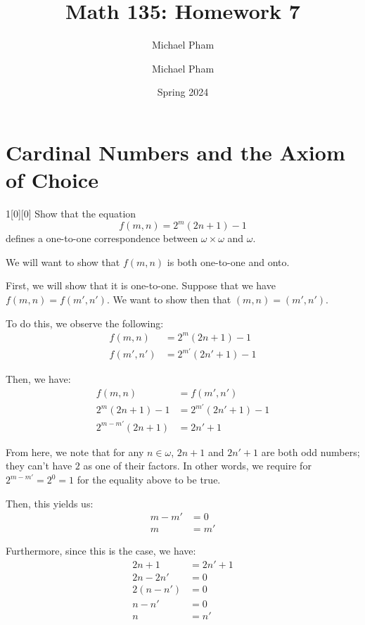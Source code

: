 \documentclass{article}
\title{#1}
\author{Michael Pham}
\date{#2}
\renewcommand{\mytitle}[2]{%
	\title{#1}
	\author{Michael Pham}
	\date{#2}
	\maketitle
	\newpage
	\listoftheorems
	\newpage
}
\begin{document}
\mytitle{Math 135: Homework 7}{Spring 2024}

\setcounter{section}{5}
\section{Cardinal Numbers and the Axiom of Choice}
\begin{hw}{1}[0][0]
	Show that the equation
	\begin{equation*}
		f(m,n) = 2^{m} (2n + 1) - 1
	\end{equation*}
defines a one-to-one correspondence between $\omega \times \omega$ and $\omega$.
\end{hw}
\begin{solution}
	We will want to show that $f(m,n)$ is both one-to-one and onto.
	
	First, we will show that it is one-to-one. Suppose that we have $f(m, n) = f(m', n')$. We want to show then that $(m,n) = (m', n')$.
	
	To do this, we observe the following:
	\begin{align*}
		f(m,n) &= 2^{m}(2n + 1) - 1 \\
		f(m', n') &= 2^{m'}(2n' + 1) - 1
	\end{align*}
	
	Then, we have:
	\begin{align*}
		f(m,n) &= f(m', n') \\
		2^{m}(2n + 1) - 1 &= 2^{m'}(2n' + 1) - 1 \\
		2^{m-m'}(2n+1) &= 2n' + 1
	\end{align*}

	From here, we note that for any $n \in \omega$, $2n+1$ and $2n' + 1$ are both odd numbers; they can't have $2$ as one of their factors. In other words, we require for $2^{m-m'} = 2^{0} = 1$ for the equality above to be true.
	
	Then, this yields us:
	\begin{align*}
		m-m' &= 0 \\
		m &= m'
	\end{align*}

	Furthermore, since this is the case, we have:
	\begin{align*}
		2n+1 &= 2n' + 1 \\
		2n - 2n' &= 0 \\
		2(n-n') &= 0 \\
		n-n' &= 0 \\
		n &= n'
	\end{align*}


\end{solution}
\end{document}
